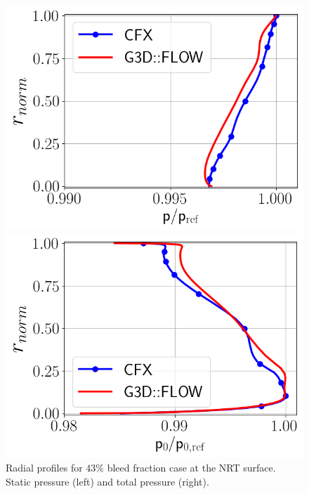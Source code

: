 \begin{figure}[h!]
  \centering
  \begin{minipage}{0.48\columnwidth}
  \includegraphics[width=1.\textwidth]{figures/PAaveB40_NRT.png}
  \end{minipage}
  \begin{minipage}{0.48\columnwidth}
  \includegraphics[width=1.\textwidth]{figures/P0MaveB40_NRT.png}
  \end{minipage}
  \caption{Radial profiles for $43\%$ bleed fraction case at the NRT surface. Static pressure (left) and total pressure (right).} \label{fig:NRT40}
\end{figure}


